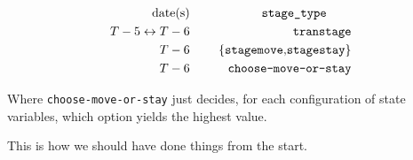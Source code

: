 \documentclass[\econtexRoot/BufferStockTheory]{subfiles}
\begin{document}
\begin{alignat}{3}
\text{date(s)}              &      &   \notag      \qquad \texttt{stage\_type} \qquad
\\ T-5\leftrightarrow T-6 & ~~~~ & \text{\texttt{transtage}}
\\ T-6 & ~~~~ & \text{\{\texttt{stagemove},\texttt{stagestay}\}}
\\ T-6 & ~~~~ & \text{\texttt{choose-move-or-stay}}
\end{alignat}

Where \texttt{choose-move-or-stay} just decides, for each configuration of state variables, which option yields the highest value.

This is how we should have done things from the start.
\end{document}
